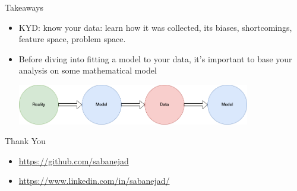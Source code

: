 \documentclass{beamer}
\begin{document}
\begin{frame}{Takeaways}
  \begin{itemize}
    \item<+-> KYD: know your data: learn how it was collected, its biases, shortcomings, feature space, problem space.
    \item<+-> Before diving into fitting a model to your data, it's important to base your analysis on some mathematical model
    \vspace{1cm}
    \begin{center}
    \includegraphics[width=0.8\textwidth]{images/reality-model-data.png}
    \end{center}
  \end{itemize}
\end{frame}

\begin{frame}{Thank You}
  \begin{itemize}
  \item \url{https://github.com/sabanejad}
  \item \url{https://www.linkedin.com/in/sabanejad/}
  \end{itemize}
\end{frame}



\end{document}
